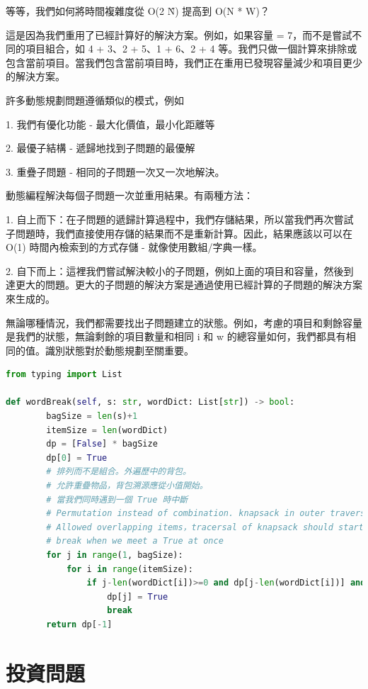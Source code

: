 \documentclass[10pt,UTF8]{ctexart}
\begin{document}
等等，我們如何將時間複雜度從 O(2 \^ N) 提高到 O(N * W)？

這是因為我們重用了已經計算好的解決方案。例如，如果容量 = 7，而不是嘗試不同的項目組合，如 4 + 3、2 + 5、1 + 6、2 + 4 等。我們只做一個計算來排除或包含當前項目。當我們包含當前項目時，我們正在重用已發現容量減少和項目更少的解決方案。

許多動態規劃問題遵循類似的模式，例如

1. 我們有優化功能 - 最大化價值，最小化距離等

2. 最優子結構 - 遞歸地找到子問題的最優解

3. 重疊子問題 - 相同的子問題一次又一次地解決。

動態編程解決每個子問題一次並重用結果。有兩種方法：

1. 自上而下：在子問題的遞歸計算過程中，我們存儲結果，所以當我們再次嘗試子問題時，我們直接使用存儲的結果而不是重新計算。因此，結果應該以可以在 O(1) 時間內檢索到的方式存儲 - 就像使用數組/字典一樣。

2. 自下而上：這裡我們嘗試解決較小的子問題，例如上面的項目和容量，然後到達更大的問題。更大的子問題的解決方案是通過使用已經計算的子問題的解決方案來生成的。

無論哪種情況，我們都需要找出子問題建立的狀態。例如，考慮的項目和剩餘容量是我們的狀態，無論剩餘的項目數量和相同 i 和 w 的總容量如何，我們都具有相同的值。識別狀態對於動態規劃至關重要。


\begin{lstlisting}[language={python}]
from typing import List

def wordBreak(self, s: str, wordDict: List[str]) -> bool:
        bagSize = len(s)+1
        itemSize = len(wordDict)
        dp = [False] * bagSize
        dp[0] = True
        # 排列而不是組合。外遍歷中的背包。
        # 允許重疊物品，背包溯源應從小值開始。
        # 當我們同時遇到一個 True 時中斷
        # Permutation instead of combination. knapsack in outer traversal。
        # Allowed overlapping items，tracersal of knapsack should start with small value。
        # break when we meet a True at once
        for j in range(1, bagSize):
            for i in range(itemSize):
                if j-len(wordDict[i])>=0 and dp[j-len(wordDict[i])] and wordDict[i]==s[j-len(wordDict[i]):j]:                    
                    dp[j] = True
                    break
        return dp[-1]
\end{lstlisting}


\newpage

\section{投資問題}
\end{document}
